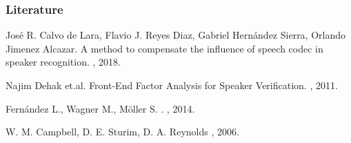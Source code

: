 \documentclass{beamer}
\begin{document}
\begin{frame}[allowframebreaks]
  \frametitle<presentation>{Literature}
    
  \begin{thebibliography}{10}
 
  \beamertemplatearticlebibitems

    José R. Calvo de Lara, Flavio J. Reyes Diaz, Gabriel Hernández Sierra, Orlando Jimenez Alcazar.
    \newblock A method to compensate the influence of speech codec in speaker recognition.
    , 2018.
  
    Najim Dehak et.al.
    \newblock Front-End Factor Analysis for Speaker Veriﬁcation.
    , 2011.
    
    Fernández L., Wagner M., Möller S. 
    . 
    , 2014.
    
    W. M. Campbell, D. E. Sturim, D. A. Reynolds
    , 2006. 
  \end{thebibliography}
  
\end{frame}
\end{document}

